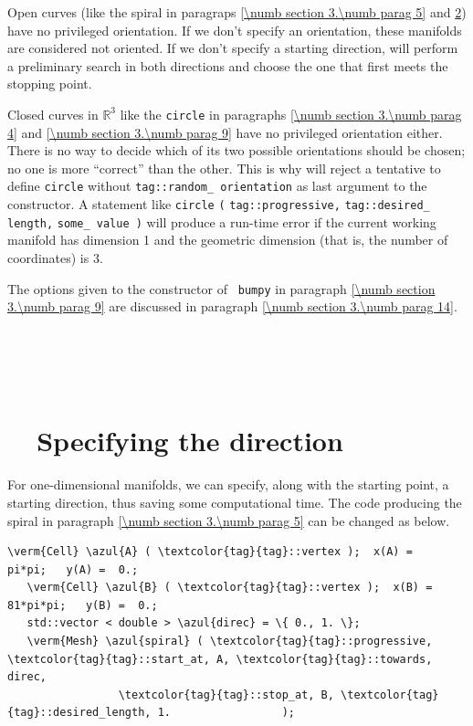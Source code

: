 Open curves (like the spiral in paragraps \ref{\numb section 3.\numb parag 5} and
\ref{\numb section 3.\numb parag 12}) have no privileged orientation.
If we don't specify an orientation, these manifolds are considered not oriented.
If we don't specify a starting direction, {\maniFEM} will perform a preliminary search
in both directions and choose the one that first meets the stopping point.

Closed curves in $ \mathbb{R}^3 $ like the {\small\tt circle} in paragraphs
\ref{\numb section 3.\numb parag 4} and \ref{\numb section 3.\numb parag 9}
have no privileged orientation either.
There is no way to decide which of its two possible orientations
should be chosen; no one is more ``correct'' than the other.
This is why {\maniFEM} will reject a tentative to define {\small\tt circle} without
{\small\tt \textcolor{tag}{tag}::random\_\,orientation} as last argument to the {\small\tt {}} constructor.
A statement like {\small\tt {}} {\small\tt circle} {\small\tt (}
{\small\tt \textcolor{tag}{tag}::progressive,} {\small\tt\textcolor{tag}{tag}::desired\_\,length,}
{\small\tt some\_\,value )}
will produce a run-time error if the current working manifold has dimension 1 and
the geometric dimension (that is, the number of coordinates) is 3.

The options given to the constructor of {\small\tt {} bumpy} in paragraph
\ref{\numb section 3.\numb parag 9} are discussed in paragraph
\ref{\numb section 3.\numb parag 14}.


\section{~~\cinza{[empty]}}\label{\numb section 3.\numb parag 11}


\section{~~Specifying the direction}\label{\numb section 3.\numb parag 12}

For one-dimensional manifolds, we can specify, along with the starting point,
a starting direction, thus saving some computational time.
The code producing the spiral in paragraph \ref{\numb section 3.\numb parag 5}
can be changed as below.

\begin{Verbatim}[commandchars=\\\{\},formatcom=\small\tt,frame=single,
   label=parag-\ref{\numb section 3.\numb parag 12}.cpp,rulecolor=\color{coment},
   baselinestretch=0.94,framesep=2mm                                            ]
   \verm{Cell} \azul{A} ( \textcolor{tag}{tag}::vertex );  x(A) =    pi*pi;   y(A) =  0.;
   \verm{Cell} \azul{B} ( \textcolor{tag}{tag}::vertex );  x(B) = 81*pi*pi;   y(B) =  0.;
   std::vector < double > \azul{direc} = \{ 0., 1. \};
   \verm{Mesh} \azul{spiral} ( \textcolor{tag}{tag}::progressive, \textcolor{tag}{tag}::start_at, A, \textcolor{tag}{tag}::towards, direc,
                 \textcolor{tag}{tag}::stop_at, B, \textcolor{tag}{tag}::desired_length, 1.                 );
\end{Verbatim}

